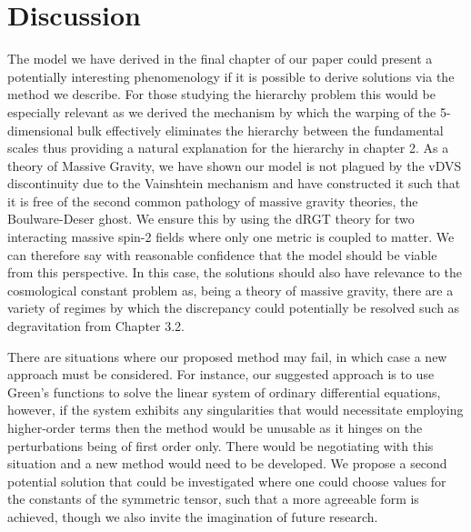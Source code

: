 \documentclass[11pt]{report}
\numberwithin{equation}{chapter}
\begin{document}
\chapter{Discussion}
The model we have derived in the final chapter of our paper could present a potentially interesting phenomenology if it is possible to derive solutions via the method we describe. For those studying the hierarchy problem this would be especially relevant as we derived the mechanism by which the warping of the 5-dimensional bulk effectively eliminates the hierarchy between the fundamental scales thus providing a natural explanation for the hierarchy in chapter 2. As a theory of Massive Gravity, we have shown our model is not plagued by the vDVS discontinuity due to the Vainshtein mechanism and have constructed it such that it is free of the second common pathology of massive gravity theories, the Boulware-Deser ghost. We ensure this by using the dRGT theory for two interacting massive spin-2 fields where only one metric is coupled to matter. We can therefore say with reasonable confidence that the model should be viable from this perspective. In this case, the solutions should also have relevance to the cosmological constant problem as, being a theory of massive gravity, there are a variety of regimes by which the discrepancy could potentially be resolved such as degravitation from Chapter 3.2. 

There are situations where our proposed method may fail, in which case a new approach must be considered. For instance, our suggested approach is to use Green's functions to solve the linear system of ordinary differential equations, however, if the system exhibits any singularities that would necessitate employing higher-order terms then the method would be unusable as it hinges on the perturbations being of first order only. There would be negotiating with this situation and a new method would need to be developed. We propose a second potential solution that could be investigated where one could choose values for the constants of the symmetric tensor, such that a more agreeable form is achieved, though we also invite the imagination of future research.
\end{document}
